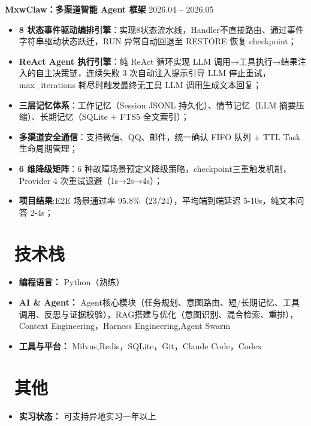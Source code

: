 \documentclass[9pt]{article}
\begin{document}
\textbf{MxwClaw：多渠道智能 Agent 框架} \hfill 2026.04 -- 2026.05 \\[0em]
\begin{itemize}[nosep]
    \item \textbf{8 状态事件驱动编排引擎}：实现8状态流水线，Handler不直接路由、通过事件字符串驱动状态跃迁，RUN 异常自动回退至 RESTORE 恢复 checkpoint；
    \item \textbf{ReAct Agent 执行引擎}：纯 ReAct 循环实现 LLM 调用→工具执行→结果注入的自主决策链，连续失败 3 次自动注入提示引导 LLM 停止重试，max\_iterations 耗尽时触发最终无工具 LLM 调用生成文本回复；
    \item \textbf{三层记忆体系}：工作记忆（Session JSONL 持久化）、情节记忆（LLM 摘要压缩）、长期记忆（SQLite + FTS5 全文索引）；
    \item \textbf{多渠道安全通信}：支持微信、QQ、邮件，统一确认 FIFO 队列 + TTL Task 生命周期管理；
    \item \textbf{6 维降级矩阵}：6 种故障场景预定义降级策略，checkpoint三重触发机制，Provider 4 次重试退避（1s→2s→4s）；
    \item \textbf{项目结果}:E2E 场景通过率 95.8\%（23/24），平均端到端延迟 5-10s，纯文本问答 2-4s；
\end{itemize}

\section{\makebox[\widthof{\faCogs}][c]{\color{CVBlue}\faCogs}\ 技术栈}
\begin{itemize}[nosep]
    \item \textbf{编程语言：} Python（熟练）
    \item \textbf{AI \& Agent：} Agent核心模块（任务规划、意图路由、短/长期记忆、工具调用、反思与证据校验），RAG搭建与优化（意图识别、混合检索、重排），Context Engineering，Harness Engineering,Agent Swarm
    \item \textbf{工具与平台：} Milvus,Redis，SQLite，Git，Claude Code，Codex
\end{itemize}


\section{\makebox[\widthof{\faInfo}][c]{\color{CVBlue}\faInfo}\ 其他}
\begin{itemize}[parsep=0.5ex]
    \item \textbf{实习状态：} 可支持异地实习一年以上
\end{itemize}
\end{document}
